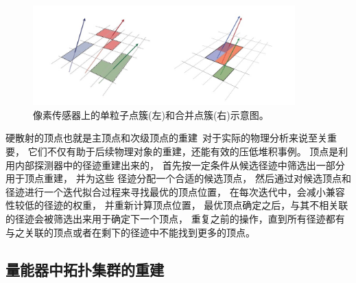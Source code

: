 \begin{figure}
  \begin{center}
    \includegraphics[width=0.9\textwidth]{figuresEXP/ATLASORT1.jpg}
  \end{center}
  \caption{
像素传感器上的单粒子点簇(左)和合并点簇(右)示意图。
  }
    \label{fig:ATLASORT1}
\end{figure}


硬散射的顶点也就是主顶点和次级顶点的重建~\cite{VERTEX1,VERTEX2}对于实际的物理分析来说至关重要，
它们不仅有助于后续物理对象的重建，还能有效的压低堆积事例。%
顶点是利用内部探测器中的径迹重建出来的，
首先按一定条件从候选径迹中筛选出一部分用于顶点重建，
并为这些
径迹分配一个合适的候选顶点，
然后通过对候选顶点和径迹进行一个迭代拟合过程来寻找最优的顶点位置，
在每次迭代中，会减小兼容性较低的径迹的权重，
并重新计算顶点位置，
最优顶点确定之后，与其不相关联的径迹会被筛选出来用于确定下一个顶点，
重复之前的操作，直到所有径迹都有与之关联的顶点或者在剩下的径迹中不能找到更多的顶点。

\subsection{量能器中拓扑集群的重建}
\label{sec:TOPTCLUS}



